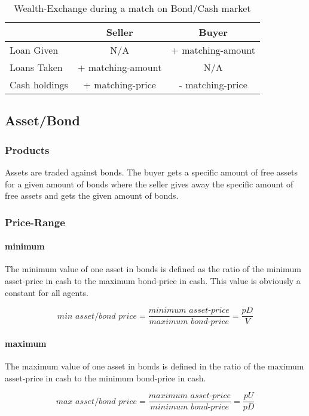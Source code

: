 \documentclass[Bachelorarbeit.tex]{subfiles}
\begin{document}
\begin{table}[H]
	\centering
	\caption{Wealth-Exchange during a match on Bond/Cash market}
	\begin{tabular} { l c c }
		& Seller & Buyer \\
		\hline
		Loan Given & N/A & + matching-amount \\
		Loans Taken & + matching-amount & N/A \\
		Cash holdings & + matching-price & - matching-price \\
		\hline
	\end{tabular}
\end{table}

\subsection{Asset/Bond}
\subsubsection{Products}
Assets are traded against bonds. The buyer gets a specific amount of free assets for a given amount of bonds where the seller gives away the specific amount of free assets and gets the given amount of bonds.

\subsubsection{Price-Range}

\paragraph{minimum}
The minimum value of one asset in bonds is defined as the ratio of the minimum asset-price in cash to the maximum bond-price in cash. This value is obviously a constant for all agents.

\begin{equation}
\textit{min asset/bond price} = \frac{\textit{minimum asset-price}}{\textit{maximum bond-price}} = \frac{pD}{V}
\end{equation}
 
\paragraph{maximum}
The maximum value of one asset in bonds is defined in the ratio of the maximum asset-price in cash to the minimum bond-price in cash.

\begin{equation}
\textit{max asset/bond price} = \frac{\textit{maximum asset-price}}{\textit{minimum bond-price}} = \frac{pU}{pD}
\end{equation}
\end{document}
